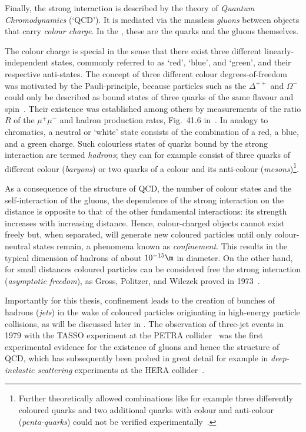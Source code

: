 Finally, the strong interaction is described by the theory of \emph{Quantum Chromodynamics} (`QCD').
It is mediated via the massless \emph{gluons} between objects that carry \emph{colour charge}.
In the \sm, these are the quarks and the gluons themselves.

The colour charge is special in the sense that there exist three different linearly-independent states, commonly referred to as `red', `blue', and `green', and their respective anti-states.
The concept of three different colour degrees-of-freedom was motivated by the Pauli-principle, because particles such as the \mbox{$\Delta^{++}$} and \mbox{$\Omega^{-}$} could only be described as bound states of three quarks of the same flavour and spin~\cite{PhysRev.139.B1006,Bardeen:1972xk}.
Their existence was established among others by measurements of the ratio $R$ of the $\mu^{+}\mu^{-}$ and hadron production rates, \cf Fig.~41.6 in~\cite{bib:PDG:2010}. 
In analogy to chromatics, a neutral or `white' state consists of the combination of a red, a blue, and a green charge.
Such colourless states of quarks bound by the strong interaction are termed \emph{hadrons}; they can for example consist of three quarks of different colour (\emph{baryons}) or two quarks of a colour and its anti-colour (\emph{mesons})\footnote{Further theoretically allowed combinations like for example three differently coloured quarks and two additional quarks with colour and anti-colour (\emph{penta-quarks}) could not be verified experimentally~\cite{bib:PDG:2010}.}.

As a consequence of the structure of QCD, \ie the number of colour states and the self-interaction of the gluons, the dependence of the strong interaction on the distance is opposite to that of the other fundamental interactions: its strength increases with increasing distance.
Hence, colour-charged objects cannot exist freely but, when separated, will generate new coloured particles until only colour-neutral states remain, a phenomena known as \emph{confinement}.
This results in the typical dimension of hadrons of about $10^{-15}\m$ in diameter.
On the other hand, for small distances coloured particles can be considered free \wrt the strong interaction (\emph{asymptotic freedom}), as Gross, Politzer, and Wilczek proved in 1973~\cite{PhysRevLett.30.1343,PhysRevLett.30.1346}.

Importantly for this thesis, confinement leads to the creation of bunches of hadrons (\emph{jets}) in the wake of coloured particles originating in high-energy particle collisions, as will be discussed later in .
The observation of three-jet events in 1979 with the TASSO experiment at the PETRA collider~\cite{Brandelik1979243} was the first experimental evidence for the existence of gluons and hence the structure of QCD, which has subsequently been probed in great detail for example in \emph{deep-inelastic scattering} experiments at the HERA collider~\cite{bib:CombinedHERA:2009wt}.



